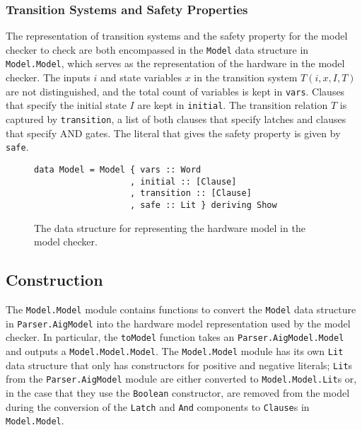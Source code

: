 \documentclass[12pt,a4paper,twoside,openright]{report}
\begin{document}
\subsubsection{Transition Systems and Safety Properties}
The representation of transition systems and the safety property for the model checker to check
are both encompassed in the \verb,Model, data structure in \verb,Model.Model,, which serves
as the representation of the hardware in the model checker.
The inputs $i$ and state variables $x$ in the transition system $T(i,x,I,T)$
are not distinguished, and the total count of variables is kept in \verb,vars,.
Clauses that specify the initial state $I$ are kept in \verb,initial,.
The transition relation $T$ is captured by \verb,transition,, a list of both clauses that specify
latches and clauses that specify AND gates.
The literal that gives the safety property is given by \verb,safe,.

\begin{figure}[H]
\centering
\begin{verbatim}
data Model = Model { vars :: Word
                   , initial :: [Clause]
                   , transition :: [Clause]
                   , safe :: Lit } deriving Show
\end{verbatim}
\caption{The data structure for representing the hardware model in the model checker.}
\end{figure}

\subsection{Construction}

The \verb,Model.Model, module contains functions to convert the \verb,Model, data
structure in \verb,Parser.AigModel, into the hardware model representation used by
the model checker. In particular, the \verb,toModel, function takes an \verb,Parser.AigModel.Model,
and outputs a \verb,Model.Model.Model,. The \verb,Model.Model, module has its own \verb,Lit,
data structure that only has constructors for positive and negative literals; \verb,Lit,s from
the \verb,Parser.AigModel, module are either converted to \verb,Model.Model.Lit,s or, in the case
that they use the \verb,Boolean, constructor, are removed from the model during the conversion of
the \verb,Latch, and \verb,And, components to \verb,Clause,s in \verb,Model.Model,.
\end{document}
